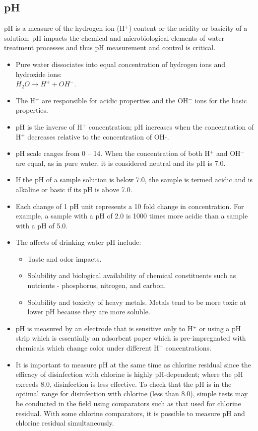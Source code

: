 \subsection{pH}	
			pH is a measure of the hydrogen ion (H$^+$) content or the acidity or basicity of a solution.  pH impacts the chemical and microbiological elements of water treatment processes and thus pH measurement and control is critical.
			\begin{itemize}
				\item Pure water dissociates into equal concentration of hydrogen ions and hydroxide ions:\\ 
				      $H_2O \rightarrow H^+ + OH^-$.
				\item The H$^+$ are responsible for acidic properties and the OH$^-$ ions for the basic properties.  
				\item pH is the inverse of H$^+$ concentration; pH increases when the concentration of H$^+$ decreases relative to the concentration of OH-. 
				\item pH scale ranges from 0 – 14. When the concentration of both H$^+$ and OH$^-$ are equal, as in pure water, it is considered neutral and its pH is 7.0.  \item If the pH of a sample solution is below 7.0, the sample is termed acidic and is alkaline or basic if its pH is above 7.0. 
				\item Each change of 1 pH unit represents a 10 fold change in concentration.  For example, a sample with a pH of 2.0 is 1000 times more acidic than a sample with a pH of 5.0.
				
				\item The affects of drinking water pH include:
				\begin{itemize}
				\item Taste and odor impacts.
				\item Solubility and biological availability of chemical constituents such as nutrients - phosphorus, nitrogen, and carbon.
				\item Solubility and toxicity of heavy metals.  Metals tend to be more toxic at lower pH because they are more soluble.
				\end{itemize} 
				\item pH is measured by an electrode that is sensitive only to H$^+$ or using a pH strip which is essentially an adsorbent paper which is pre-impregnated with chemicals which change color under different H$^+$ concentrations.
						
\item {}It is important to measure pH at the same time as chlorine residual since the efficacy of disinfection with chlorine is highly pH-dependent; where the pH exceeds 8.0, disinfection is less effective. To check that the pH is in the optimal range for disinfection with chlorine (less than 8.0), simple tests may be conducted in the field using comparators such as that used for chlorine residual. With some chlorine comparators, it is possible to measure pH and chlorine residual simultaneously.


\end{itemize}
